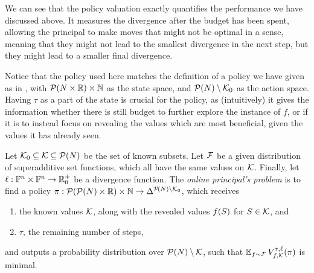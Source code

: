 We can see that the policy valuation exactly quantifies the performance we have discussed above.
It measures the divergence after the budget has been spent, allowing the principal to make moves that might not be optimal in a  sense, meaning that they might not lead to the smallest divergence in the next step, but they might lead to a smaller final divergence.


Notice that the policy used here matches the definition of a policy we have given as  in , with $ \mathcal{P}\!\left(N \times \mathbb{R}\right) \times \mathbb{N} $ as the state space, and $ \mathcal{P}\!\left(N\right) \setminus \mathcal{K}_0 $ as the action space.
Having $ \tau $ as a part of the state is crucial for the policy, as (intuitively) it gives the information whether there is still budget to further explore the instance of $ f $, or if it is to instead focus on revealing the values which are most beneficial, given the values it has already seen.

\begin{defi} \label{def:online-pp}
  Let $ \mathcal{K}_0 \subseteq \mathcal{K} \subseteq \mathcal{P}\!\left(N\right) $ be the set of known subsets.
  Let $ \mathcal{F} $ be a given distribution of superadditive set functions, which all have the same values on $ \mathcal{K} $.
  Finally, let $ \ell: \mathbb{F}^n \times \mathbb{F}^n \to \mathbb{R}^+_0 $ be a divergence function.
  The \emph{online principal's problem} is to find a policy $ \pi: \mathcal{P}\!\left(\mathcal{P}\!\left(N\right) \times \mathbb{R}\right) \times \mathbb{N} \to \Delta^{\mathcal{P}\!\left(N\right) \setminus \mathcal{K}_0} $,
  which receives \begin{enumerate}[ ]
    \item the known values $ \mathcal{K} $, along with the revealed values $ f\!\left(S\right) $ for $ S \in \mathcal{K} $, and
    \item $ \tau $, the remaining number of steps,
  \end{enumerate}
  and outputs a probability distribution over $ \mathcal{P}\!\left(N\right) \setminus \mathcal{K} $, such that $ \operatorname*{\mathbb{E}}_{f \sim \mathcal{F}} V^{\tau,\ell}_{f,\mathcal{K}}\!\left(\pi\right) $ is minimal.
\end{defi}

